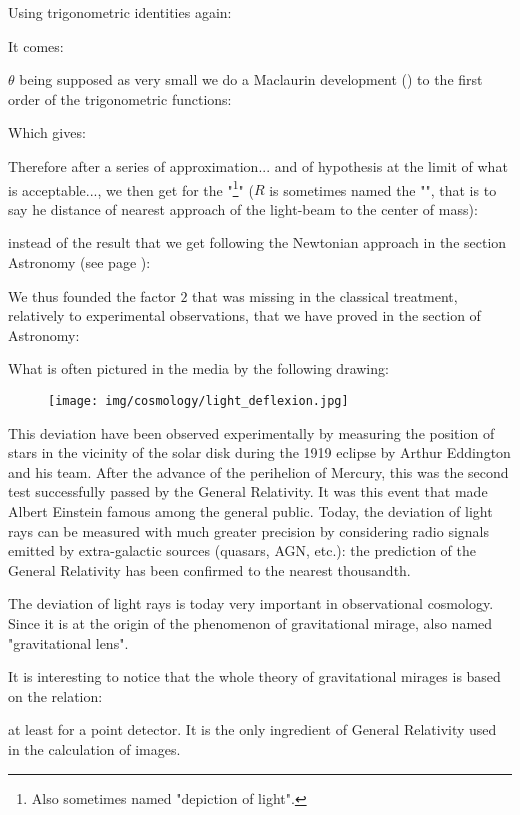 	Using trigonometric identities again:
	
	It comes:
	
	$\theta$ being supposed as very small we do a Maclaurin development () to the first order of the trigonometric functions:
	
	Which gives:
	
	Therefore after a series of approximation... and of hypothesis at the limit of what is acceptable..., we then get for the "\footnote{Also sometimes named "depiction of light".}" ($R$ is sometimes named the "", that is to say he distance of nearest approach of the light-beam to the center of mass):
	
	instead of the result that we get following the Newtonian approach in the section Astronomy (see page \pageref{classical deflection of light}):
	
	We thus founded the factor $2$ that was missing in the classical treatment, relatively to experimental observations, that we have proved in the section of Astronomy:
	
	What is often pictured in the media by the following drawing:
	\begin{figure}[H]
		\centering
		\texttt{[image: img/cosmology/light\_deflexion.jpg]}	
	\end{figure}
	This deviation have been observed experimentally by measuring the position of stars in the vicinity of the solar disk during the 1919 eclipse by Arthur Eddington and his team. After the advance of the perihelion of Mercury, this was the second test successfully passed by the General Relativity. It was this event that made Albert Einstein famous among the general public. Today, the deviation of light rays can be measured with much greater precision by considering radio signals emitted by extra-galactic sources (quasars, AGN, etc.): the prediction of the General Relativity has been confirmed to the nearest thousandth.

	The deviation of light rays is today very important in observational cosmology. Since it is at the origin of the phenomenon of gravitational mirage, also named "gravitational lens".

	It is interesting to notice that the whole theory of gravitational mirages is based on the relation:
	
	at least for a point detector. It is the only ingredient of General Relativity used in the calculation of images.
	
